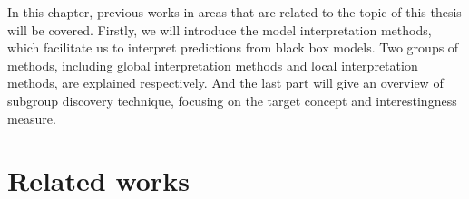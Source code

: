 In this chapter, previous works in areas that are related to the topic of this thesis will be covered. Firstly, we will introduce the model interpretation methods, which facilitate us to interpret predictions from black box models. Two groups of methods, including global interpretation methods and local interpretation methods, are explained respectively. And the last part will give an overview of subgroup discovery technique, focusing on the target concept and interestingness measure. 
\section{Related works}


